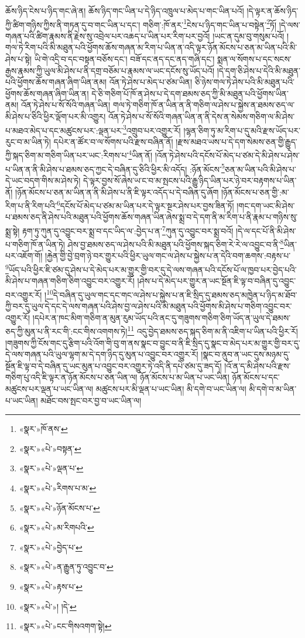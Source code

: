 ཆོས་ཉིད་ངེས་པ་ཉིད་གང་ཞེ་ན། ཆོས་ཉིད་གང་ཡིན་པ་དེ་ཉིད་འཁྲུལ་པ་མེད་པ་གང་ཡིན་པའོ། །དེ་ལྟར་ན་ཆོས་ཉིད་ཀྱི་ཚིག་གཉིས་ཀྱིས་ནི་གཏན་དུ་བ་གང་ཡིན་པ་དང་། གཅིག་:ཁོ་ནར་\footnote{«སྣར་»ཁོ་ནས་}ངེས་པ་ཉིད་གང་ཡིན་པ་བསྟེན་\footnote{«སྣར་»«པེ་»བསྟན་}ཏོ། །དེ་ལས་གཞན་པའི་ཚིག་རྣམས་ནི་རྗེས་སུ་འབྲེལ་པར་འཆད་པ་ཡིན་པར་རིག་པར་བྱའོ། །ཡང་ན་དུམ་བུ་གསུམ་པའོ། །གལ་ཏེ་རིག་པའི་མི་མཐུན་པའི་ཕྱོགས་ཆོས་གཞན་མ་རིག་པ་ཡིན་ན་འདི་ལྟར་ཉོན་མོངས་པ་ཅན་མ་ཡིན་པའི་མི་ཤེས་པ་སྟེ། ཡི་གེ་འདྲི་བ་དང་བསྟན་བཅོས་དང་། བཟོ་དང་ནད་དང་ནད་གཞི་དང་། སྨན་ལ་སོགས་པ་དང་སངས་རྒྱས་རྣམས་ཀྱི་ཡུལ་མི་ཤེས་པ་ནི་དགྲ་བཅོམ་པ་རྣམས་ལ་ཡང་དངོས་སུ་ཡོད་པའོ། །དེ་དག་ཅི་ཤེས་པ་དེའི་མི་མཐུན་པའི་ཕྱོགས་ཆོས་གཞན་ཞིག་ཡིན་ནམ། འོན་ཏེ་ཤེས་པ་མེད་པ་ཙམ་ཡིན། ཅི་ཉེས་གལ་ཏེ་ཤེས་པའི་མི་མཐུན་པའི་ཕྱོགས་ཆོས་གཞན་ཞིག་ཡིན་ན། དེ་ཅི་གཅིག་པོ་ཁོ་ན་ཤེས་པ་དེ་དག་ཐམས་ཅད་ཀྱི་མི་མཐུན་པའི་ཕྱོགས་ཡིན་ནམ། འོན་ཏེ་ཤེས་པ་སོ་སོའི་གཞན་ཡིན། གལ་ཏེ་གཅིག་ཁོ་ན་ཡིན་ན་ནི་གཅིག་ལ་ཤེས་པ་སྐྱེས་ན་ཐམས་ཅད་ལ་མི་ཤེས་པ་ཅིའི་ཕྱིར་ལྡོག་པར་མི་འགྱུར། འོན་ཏེ་ཤེས་པ་སོ་སོའི་གཞན་ཡིན་ན་ནི་དེས་ན་སེམས་གཅིག་ལ་མི་ཤེས་པ་མཐའ་མེད་པ་དང་མཚུངས་པར་:ལྡན་པར་\footnote{«སྣར་»«པེ་»ལྡན་པ་}འགྲུབ་པར་འགྱུར་རོ། །ལྷན་ཅིག་ཏུ་མ་རིག་པ་དུ་མའི་རྫས་ཡོད་པར་རུང་བ་མ་ཡིན་ཏེ། དཔེར་ན་ཚོར་བ་ལ་སོགས་པའི་རྫས་བཞིན་ནོ། །རྫས་མཐའ་ཡས་པ་དེ་དག་སེམས་ཅན་གྱི་རྒྱུད་ཀྱི་སྐད་ཅིག་མ་གཅིག་ཡིན་པར་ཡང་:རིགས་པ་\footnote{«སྣར་»«པེ་»རིགས་པ་མ་}ཡིན་ནོ། །འོན་ཏེ་ཤེས་པའི་དངོས་པོ་མེད་པ་ཙམ་དེ་མི་ཤེས་པ་ཤེས་པ་ཡིན་ན་ནི་མི་ཤེས་པ་ཐམས་ཅད་ཀྱང་དེ་བཞིན་དུ་ཅིའི་ཕྱིར་མི་འདོད། :ཉོན་མོངས་\footnote{«སྣར་»«པེ་»ཉོན་མོངས་པ་}ཅན་མ་ཡིན་པའི་མི་ཤེས་པ་དེ་ཡང་བདག་གིས་མ་ཤེས་ཏེ། དེ་ལྟར་བྱས་སོ་ཞེས་ཡ་ང་བ་མ་སྤངས་པའི་རྒྱུ་ཉིད་ཡིན་པར་ཉེ་བར་བརྟགས་པ་ཡིན་ནོ། །ཉོན་མོངས་པ་ཅན་མ་ཡིན་ན་ནི་མི་ཤེས་པ་ནི་ཇི་ལྟར་འདོད་པ་དེ་བཞིན་དུ་ཞོག །ཉོན་མོངས་པ་ཅན་གྱི་:མ་རིག་པ་ནི་རིག་པའི་\footnote{«སྣར་»«པེ་»མ་རིགཔའི་}དངོས་པོ་མེད་པ་ཙམ་མ་ཡིན་པར་དེ་ལྟར་སྔར་ཤེས་པར་བྱས་ཟིན་ཏོ། །གང་དག་ཡང་མི་ཤེས་པ་ཐམས་ཅད་ནི་ཤེས་པའི་མཐུན་པའི་ཕྱོགས་ཆོས་གཞན་ཡིན་ཞེས་སྨྲ་བ་དེ་དག་ནི་མ་རིག་པ་ནི་རྣམ་པ་གཉིས་སུ་སྨྲ་སྟེ། རྟག་ཏུ་ཀུན་དུ་འབྱུང་བར་སྨྲ་བ་དང་ཡིད་ལ་:བྱེད་པ་ན་\footnote{«སྣར་»«པེ་»བྱེད་པ་}ཀུན་དུ་འབྱུང་བར་སྨྲ་བའོ། །དེ་ལ་དང་པོ་ནི་མི་ཤེས་པ་གཅིག་ཁོ་ན་ཡིན་ཏེ། ཤེས་བྱ་ཐམས་ཅད་ལ་ཤེས་པའི་མི་མཐུན་པའི་ཕྱོགས་སྐད་ཅིག་རེ་རེ་ལ་འབྱུང་བ་ནི་\footnote{«སྣར་»«པེ་»ན་རྒྱུན་ཏུ་འབྱུང་བ་}ཡིན་པར་འཇོག་གོ། །རྐྱེན་གྱི་བྱེ་བྲག་ཉེ་བར་གྱུར་པའི་ཕྱིར་ཡུལ་གང་ལ་ཤེས་པ་སྐྱེས་པ་ན་དེའི་བག་ཆགས་:བརྟས་པ་\footnote{«སྣར་»«པེ་»རྟས་པ་}ཡོད་པའི་ཕྱིར་ཇི་ཙམ་དུ་ཤེས་པ་དེ་མེད་པར་མ་གྱུར་གྱི་བར་དུ་དེ་ལས་གཞན་པའི་དངོས་པོ་ལ་ཁྱབ་པར་བྱེད་པའི་མི་ཤེས་པ་གཞན་གཅིག་ཅིག་འབྱུང་བར་འགྱུར་རོ། །ཤེས་པ་དེ་མེད་པར་གྱུར་ན་ཡང་སྔོན་ཇི་ལྟ་བ་བཞིན་དུ་འབྱུང་བར་འགྱུར་རོ། །\footnote{«སྣར་»«པེ་»། །དེ་}དེ་བཞིན་དུ་ཡུལ་གང་དང་གང་ལ་ཤེས་པ་སྐྱེས་པ་ན་ཇི་སྲིད་དུ་ཐམས་ཅད་མཁྱེན་པ་ཉིད་མ་ཐོབ་ཀྱི་བར་དུ་ཡུལ་དེ་དང་དེ་ལས་གཞན་པའི་ཤེས་བྱ་ལ་ཤེས་པའི་མི་མཐུན་པའི་ཕྱོགས་མི་ཤེས་པ་གཅིག་འབྱུང་བར་འགྱུར་རོ། །དཔེར་ན་ཁང་མིག་གཅིག་ན་མུན་རུམ་ཡོད་པའི་ནང་དུ་གཟུགས་གཅིག་ཅིག་ཡོད་ན་ཡུལ་དེ་ཐམས་ཅད་ཀྱི་མུན་པ་ནི་རང་གི་:ངང་གིས་འགགས་ཏེ།\footnote{«སྣར་»«པེ་»ངང་གིསའགག་སྟེ།} འདུ་བྱེད་ཐམས་ཅད་སྐད་ཅིག་མ་ནི་འཇིག་པ་ཡིན་པའི་ཕྱིར་རོ། །གཟུགས་ཀྱི་ངོས་གང་དུ་རྩིག་པའི་འོག་གི་བུ་ག་ནས་སྣང་བ་བྱུང་བ་ནི་ཇི་སྲིད་དུ་སྣང་བ་མེད་པར་མ་གྱུར་གྱི་བར་དུ་དེ་ལས་གཞན་པའི་ཡུལ་ལྷག་མ་དེ་དག་ཉིད་དུ་མུན་པ་འབྱུང་བར་འགྱུར་རོ། །སྣང་བ་ནུབ་ན་ཡང་དུས་མཉམ་དུ་སྔོན་ཇི་ལྟ་བ་དེ་བཞིན་དུ་ཡང་མུན་པ་འབྱུང་བར་འགྱུར་ཏེ་འདི་ནི་དཔེ་ཙམ་དུ་ཟད་དོ། །འོ་ན་ད་མི་ཤེས་པའི་རྫས་གཅིག་པུ་འདི་ཇི་ལྟར་ན་ཉོན་མོངས་པ་ཅན་ཡིན་ལ། ཉོན་མོངས་པ་མ་ཡིན་པ་ཡང་ཡིན། ཉོན་མོངས་པ་དང་མཚུངས་པར་ལྡན་པ་ཡང་ཡིན་ལ། མཚུངས་པར་མི་ལྡན་པ་ཡང་ཡིན། མི་དགེ་བ་ཡང་ཡིན་ལ། མི་དགེ་བ་མ་ཡིན་པ་ཡང་ཡིན། མཐོང་བས་སྤང་བར་བྱ་བ་ཡང་ཡིན་ལ། 